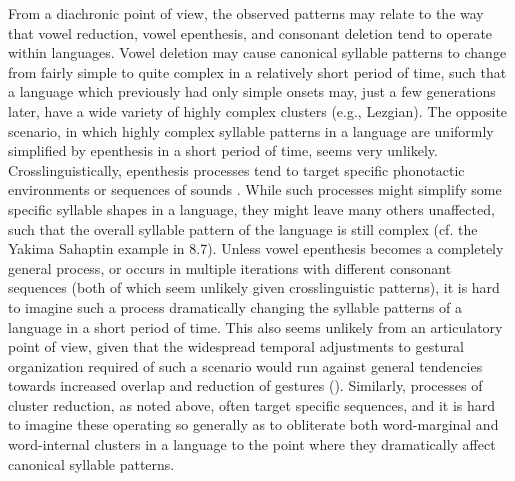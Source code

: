   From a diachronic point of view, the observed patterns may relate to the way that vowel reduction, vowel epenthesis, and consonant deletion tend to operate within languages. Vowel deletion may cause canonical syllable patterns to change from fairly simple to quite complex in a relatively short period of time, such that a language which previously had only simple onsets may, just a few generations later, have a wide variety of highly complex clusters (e.g., Lezgian). The opposite scenario, in which highly complex syllable patterns in a language are uniformly simplified by epenthesis in a short period of time, seems very unlikely. Crosslinguistically, epenthesis processes tend to target specific phonotactic environments or sequences of sounds \citep{Hall2011}. While such processes might simplify some specific syllable shapes in a language, they might leave many others unaffected, such that the overall syllable pattern of the language is still complex (cf. the Yakima Sahaptin example in 8.7). Unless vowel epenthesis becomes a completely general process, or occurs in multiple iterations with different consonant sequences (both of which seem unlikely given crosslinguistic patterns), it is hard to imagine such a process dramatically changing the syllable patterns of a language in a short period of time. This also seems unlikely from an articulatory point of view, given that the widespread temporal adjustments to gestural organization required of such a scenario would run against general tendencies towards increased overlap and reduction of gestures (\citealt{BrowmanGoldstein1992b}). Similarly, processes of cluster reduction, as noted above, often target specific sequences, and it is hard to imagine these operating so generally as to obliterate both word-marginal and word-internal clusters in a language to the point where they dramatically affect canonical syllable patterns. 

